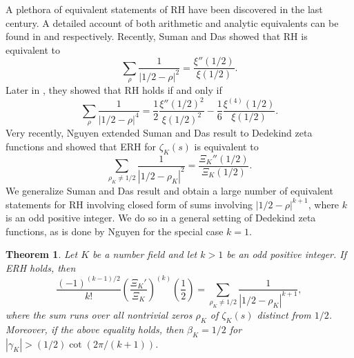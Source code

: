 \documentclass[12pt]{amsart}
\numberwithin{equation}{section}
\theoremstyle{myplain}
\theoremstyle{mydefinition}
\theoremstyle{plain}
\newtheorem{theorem}{Theorem}[section]
\theoremstyle{definition}
\begin{document}
A plethora of equivalent statements of RH have been discovered in the last century. A detailed account of both arithmetic and analytic equivalents can be found in \cite{Broughan1} and \cite{Broughan2} respectively. Recently, Suman and Das \cite{Suman} showed that RH is equivalent to 
\[
\sum_{\rho} \frac{1}{|1/2 - \rho|^2} = \frac{\xi''(1/2)}{\xi(1/2)}.
\]
Later in \cite{suman2022note}, they showed that RH holds if and only if
\[
\sum_{\rho} \frac{1}{|1/2 - \rho|^4} = \frac{1}{2} \frac{\xi''(1/2)^2}{\xi (1/2)^2} - \frac{1}{6} \frac{\xi^{(4)}(1/2)}{\xi(1/2)}.
\]
Very recently, Nguyen \cite{nguyen2025some} extended Suman and Das result to Dedekind zeta functions and showed that ERH for $\zeta_K(s)$ is equivalent to 
\[
\sum_{\rho_K \neq 1/2} \frac{1}{|1/2 - \rho_K|^2} = \frac{\Xi_K''(1/2)}{\Xi_K(1/2)}.
\]
We generalize Suman and Das result and obtain a large number of equivalent statements for RH involving closed form of sums involving $|1/2 - \rho|^{k + 1}$, where $k$ is an odd positive integer. We do so in a general setting of Dedekind zeta functions, as is done by Nguyen for the special case $k = 1$.

\begin{theorem}
Let $K$ be a number field and let $k > 1$ be an odd positive integer. If ERH holds, then 
\begin{equation} \label{main result}
\frac{(-1)^{(k - 1)/2}}{k!} \left( \frac{\Xi_K'}{\Xi_K} \right)^{(k)} \left(\frac{1}{2} \right) = \sum_{\rho_K \neq 1/2} \frac{1}{|1/2 - \rho_K|^{k + 1}},
\end{equation}
where the sum runs over all nontrivial zeros $\rho_K$ of $\zeta_K(s)$ distinct from $1/2$. Moreover, if the above equality holds, then $\beta_K = 1/2$ for $|\gamma_K| > (1/2)\cot (2 \pi/(k + 1))$.
\end{theorem}
\end{document}
